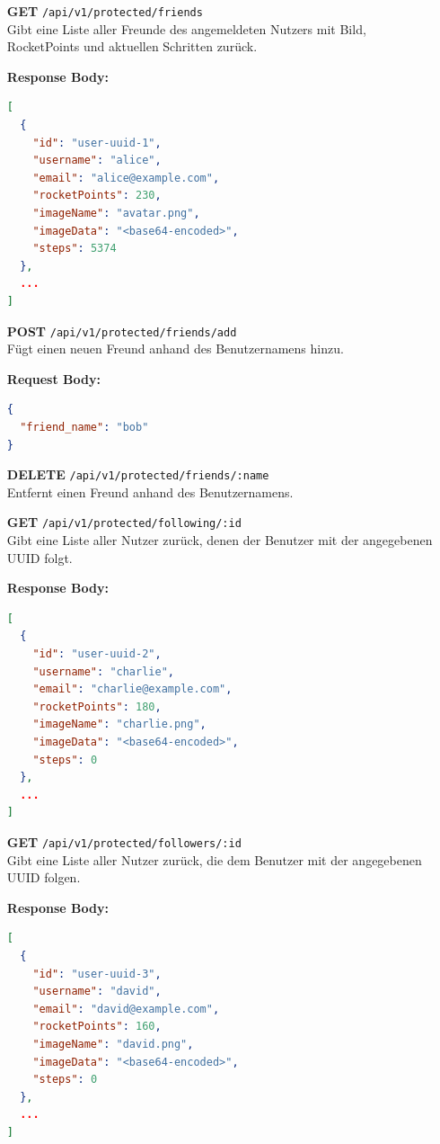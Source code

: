 \documentclass[11pt,a4paper]{article}
\begin{document}
\begin{itemize}[leftmargin=1.5cm]
    \item[\textbf{GET}] \texttt{/api/v1/protected/friends} \\
    Gibt eine Liste aller Freunde des angemeldeten Nutzers mit Bild, RocketPoints und aktuellen Schritten zurück.

    \textbf{Response Body:}
    \begin{lstlisting}[language=json]
[
  {
    "id": "user-uuid-1",
    "username": "alice",
    "email": "alice@example.com",
    "rocketPoints": 230,
    "imageName": "avatar.png",
    "imageData": "<base64-encoded>",
    "steps": 5374
  },
  ...
]
    \end{lstlisting}

    \item[\textbf{POST}] \texttt{/api/v1/protected/friends/add} \\
    Fügt einen neuen Freund anhand des Benutzernamens hinzu.

    \textbf{Request Body:}
    \begin{lstlisting}[language=json]
{
  "friend_name": "bob"
}
    \end{lstlisting}


    \item[\textbf{DELETE}] \texttt{/api/v1/protected/friends/:name} \\
    Entfernt einen Freund anhand des Benutzernamens.


    \item[\textbf{GET}] \texttt{/api/v1/protected/following/:id} \\
    Gibt eine Liste aller Nutzer zurück, denen der Benutzer mit der angegebenen UUID folgt.

    \textbf{Response Body:}
    \begin{lstlisting}[language=json]
[
  {
    "id": "user-uuid-2",
    "username": "charlie",
    "email": "charlie@example.com",
    "rocketPoints": 180,
    "imageName": "charlie.png",
    "imageData": "<base64-encoded>",
    "steps": 0
  },
  ...
]
    \end{lstlisting}

    \item[\textbf{GET}] \texttt{/api/v1/protected/followers/:id} \\
    Gibt eine Liste aller Nutzer zurück, die dem Benutzer mit der angegebenen UUID folgen.

    \textbf{Response Body:}
    \begin{lstlisting}[language=json]
[
  {
    "id": "user-uuid-3",
    "username": "david",
    "email": "david@example.com",
    "rocketPoints": 160,
    "imageName": "david.png",
    "imageData": "<base64-encoded>",
    "steps": 0
  },
  ...
]
    \end{lstlisting}
\end{itemize}
\end{document}

